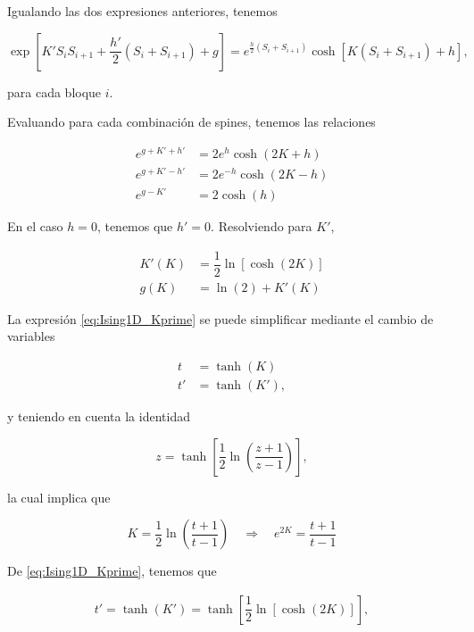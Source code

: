 \documentclass[10pt]{article}
\begin{document}
Igualando las dos expresiones anteriores, tenemos

\begin{equation}
 \exp\left[  K' S_i S_{i+1} + \dfrac{h'}{2} (S_i + S_{i+1}) + g \right] = e^{\frac{h}{2} (S_i + S_{i+1}) }  \cosh\left[ K (S_i + S_{i+1}) + h \right],
\end{equation}

para cada bloque $i$.

Evaluando para cada combinaci\'on de spines, tenemos las relaciones

\begin{align}
e^{g+K'+h'} &= 2e^{h}\cosh(2K+h) \label{eq:Ising1D_Rec1}\\
e^{g+K'-h'} &= 2e^{-h}\cosh(2K-h) \label{eq:Ising1D_Rec2} \\
e^{g-K'} &= 2\cosh(h)  \label{eq:Ising1D_Rec3}
\end{align}

En el caso $h=0$, tenemos que $h'=0$. Resolviendo para $K'$,

\begin{align}
K'(K) &= \dfrac{1}{2} \ln \left[ \cosh(2K) \right] \label{eq:Ising1D_Kprime}\\
g(K) &= \ln(2) + K'(K)
\end{align}

La expresi\'on \ref{eq:Ising1D_Kprime} se puede simplificar mediante el cambio de variables

\begin{align}
t  &= \tanh(K)\\
t' &= \tanh(K'),
\end{align}

y teniendo en cuenta la identidad 

\begin{equation}
z = \tanh\left[\dfrac{1}{2}\ln\left( \dfrac{z+1}{z-1} \right)\right],
\end{equation}

la cual implica que 

\begin{equation}
K = \dfrac{1}{2}\ln\left( \dfrac{t+1}{t-1} \right) \quad \Rightarrow \quad e^{2K} = \dfrac{t+1}{t-1} 
\end{equation}

De \ref{eq:Ising1D_Kprime}, tenemos que

\begin{align}
 t' = \tanh(K') = \tanh \left[ \dfrac{1}{2} \ln \left[ \cosh(2K) \right]  \right],
\end{align}
\end{document}
